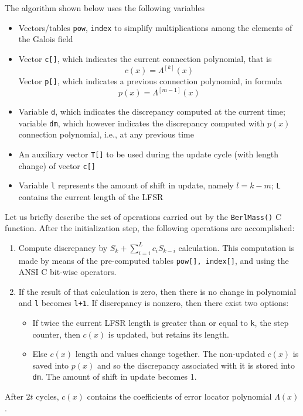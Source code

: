 The algorithm shown below uses the following variables
\begin{itemize}
\item Vectors/tables \texttt{pow}, \texttt{index} to simplify multiplications among the elements of the Galois field
\item Vector \texttt{c[]}, which indicates the current connection polynomial, that is \[ c(x) = \Lambda^{[k]}(x)\]
Vector \texttt{p[]}, which indicates a previous connection polynomial, in formula
\[ p(x)=\Lambda^{[m-1]}(x)\]
\item Variable \texttt{d}, which indicates the discrepancy computed at the current time; variable \texttt{dm}, which however indicates the discrepancy computed with \(p(x)\) connection polynomial, i.e., at any previous time
\item An auxiliary vector \texttt{T[]} to be used during the update cycle (with length change) of vector \texttt{c[]}
\item Variable \texttt{l} represents the amount of shift in update, namely \(l = k-m\); \texttt{L} contains the current length of the LFSR
\end{itemize}

Let us briefly describe the set of operations carried out by the \texttt{BerlMass()} C function. After the initialization step, the following operations are accomplished:
\begin{enumerate}
\item Compute discrepancy by \(S_k+ \sum_{i = i}^{L} {c_i S_{k-i}}\) calculation. This computation is made by means of the pre-computed tables \texttt{pow[], index[]}, and using the ANSI C bit-wise operators.
\item If the result of that calculation is zero, then there is no change in polynomial and \texttt{l} becomes \texttt{l+1}. If discrepancy is nonzero, then there exist two options:
    \begin{itemize}
    \item If twice the current LFSR length is greater than or equal to \texttt{k}, the step counter, then \(c(x)\) is updated, but retains its length.
    \item Else \(c(x)\) length and values change together. The non-updated \(c(x)\) is saved into \(p(x)\) and so the discrepancy associated with it is stored into \texttt{dm}. The amount of shift in update becomes 1.
    \end{itemize}
\end{enumerate}
After \(2t\) cycles, \(c(x)\) contains the coefficients of error locator polynomial \(\Lambda(x)\).



